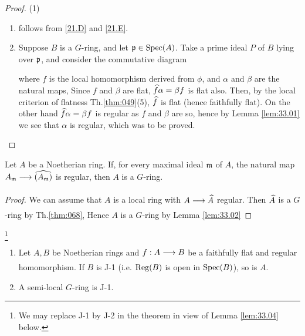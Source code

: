 \documentclass[../main]{subfiles}
\begin{document}
\begin{proof}(1)
\begin{enumerate}
    \item follows from \ref{21.D} and \ref{21.E}.

    \item Suppose $B$ is a $G$-ring, and let $\mathfrak{p} \in \operatorname{Spec}(A)$. Take a prime ideal $P$ of $B$ lying over $\mathfrak{p}$, and consider the commutative diagram
    \begin{center}
\end{center}
where $f$ is the local homomorphism derived from $\phi$, and $\alpha$ and $\beta$ are the natural maps, Since $f$ and $\beta$ are flat, $\widehat{f}\alpha=\beta f$ is flat also. Then, by the local criterion of flatness Th.\ref{thm:049}(5), $\widehat{f}$ is flat (hence faithfully flat). On the other hand $\widehat{f} \alpha = \beta f$ is regular as $f$ and $\beta$ are so, hence by Lemma \ref{lem:33.01} we see that $\alpha$ is regular, which was to be proved.
\end{enumerate}
\end{proof} 

\begin{partheorem}\label{thm:075} Let $A$ be a Noetherian ring. If, for every maximal ideal $\mathfrak{m}$ of $A$, the natural map $A_{\ideal{m}} \varrightarrow{}\completion{(A_{\ideal{m}})} $ is regular, then $A$ is a $G$-ring.
\end{partheorem}

\begin{proof}
We can assume that $A$ is a local ring with $A \varrightarrow{} \completion{A}$ regular. Then $\widehat{A}$ is a $G$-ring by Th.\ref{thm:068}, Hence $A$ is a $G$-ring by Lemma \ref{lem:33.02}
\end{proof}

\begin{partheorem}\label{thm:076} \footnote{We may replace J-1 by J-2 in the theorem in view of Lemma \ref{lem:33.04} below.}
\begin{enumerate}
    \item Let $A, B$ be Noetherian rings and $f: A \varrightarrow{} B$ be a faithfully flat and regular homomorphism. If $B$ is J-1 (i.e. $\operatorname{Reg}(B)$ is open in $\operatorname{Spec}(B)$), so is $A$.

    \item A semi-local $G$-ring is J-1.
\end{enumerate}
\end{partheorem}
\end{document}
